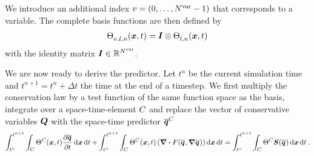 We introduce an additional index $v = (0, \ldots, N^{\text{var}} - 1)$ that corresponds to a variable.
The complete basis functions are then defined by
\begin{align}
  \stbasis[][v,l,n] (\bm{x},t)= \bm{I} \otimes \stbasis[][l,n] (\bm{x}, t)
\end{align}
with the identity matrix $\bm{I} \in \mathbb{R}^{N^{\text{var}}}$. 

We are now ready to derive the predictor.
Let $t^n$ be the current simulation time and $t^{n+1} = t^n + \Delta t$ the time at the end of a timestep.
We first multiply the conservation law by a test function of the same function space as the basis, integrate over a space-time-element $C_{}$ and replace the vector of conservative variables $\bm{Q}$ with the space-time predictor $\stpredictor[\cell]$
\begin{equation}\label{eq:weak-pde-space-time}
\intdt{\intdcell{
    \sttestfunction[\cell](\bm{x}, t)
    \pdv{\stpredictor}{t}
}}
+
\intdt{\intdcell{
    \sttestfunction[\cell](\bm{x}, t)
    \left(
      \divergence{\flux(\stpredictor, \gradient{\stpredictor})}
    \right)
}}
=
\intdt{\intdcell{
  \sttestfunction[\cell] \source(\stpredictor)
}}.
\end{equation}

